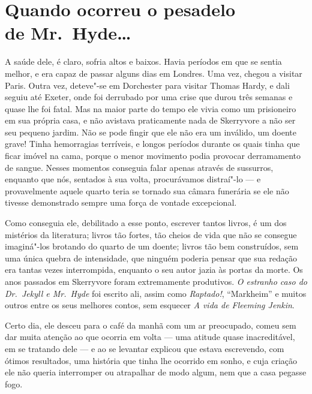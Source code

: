 \chapter[Quando ocorreu o pesadelo de Mr.~Hyde\ldots{}\\ \textit{Lloyd Osbourne}]{Quando ocorreu o pesadelo\\ de Mr.~Hyde\ldots{}}

A saúde dele, é claro, sofria altos e baixos.  Havia períodos em que se
sentia melhor, e era capaz de passar alguns dias em Londres.  Uma vez,
chegou a visitar Paris.  Outra vez, deteve"-se em Dorchester para
visitar Thomas Hardy, e dali seguiu até Exeter, onde foi derrubado por
uma crise que durou três semanas e quase lhe foi fatal.  Mas na maior
parte do tempo ele vivia como um prisioneiro em sua própria casa, e não
avistava praticamente nada de Skerryvore a não ser seu pequeno jardim. 
Não se pode fingir que ele não era um inválido, um doente grave!  Tinha
hemorragias terríveis, e longos períodos durante os quais tinha que
ficar imóvel na cama, porque o menor movimento podia provocar		
derramamento de sangue.  Nesses momentos conseguia falar apenas
através de sussurros, enquanto que nós, sentados à sua volta,
procurávamos distraí"-lo --- e provavelmente aquele quarto teria se
tornado sua câmara funerária se ele não tivesse demonstrado sempre uma
força de vontade excepcional.

Como conseguia ele, debilitado a esse ponto, escrever tantos livros, é
um dos mistérios da literatura; livros tão fortes, tão cheios de vida
que não se consegue imaginá"-los brotando do quarto de um doente; livros
tão bem construídos, sem uma única quebra de intensidade, que ninguém
poderia pensar que sua redação era tantas vezes interrompida, enquanto
o seu autor jazia às portas da morte.  Os anos passados em Skerryvore
foram extremamente produtivos.  \textit{O estranho caso do Dr.~Jekyll e
Mr.~Hyde} foi escrito ali, assim como \textit{Raptado!}, “Markheim” e
muitos outros entre os seus melhores contos, sem esquecer \textit{A
vida de Fleeming Jenkin}. 

Certo dia, ele desceu para o café da manhã com um ar preocupado, comeu
sem dar muita atenção ao que ocorria em volta --- uma atitude quase
inacreditável, em se tratando dele --- e ao se levantar explicou que
estava escrevendo, com ótimos resultados, uma história que tinha lhe
ocorrido em sonho, e cuja criação ele não queria interromper ou
atrapalhar de modo algum, nem que a casa pegasse fogo.

